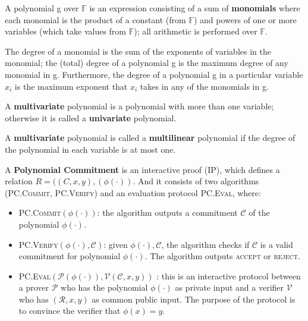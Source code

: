 \begin{definition}
A polynomial g over $\mathbb{F}$ is an expression consisting of a sum of \textbf{monomials} where each monomial is the product of a constant (from $\mathbb{F}$) and powers of one or more variables (which take values from $\mathbb{F}$); all arithmetic is performed over $\mathbb{F}$.
\end{definition}

\begin{definition}
The degree of a monomial is the sum of the exponents of variables in the monomial; the (total) degree of a polynomial g is the maximum degree of any monomial in g. Furthermore, the degree of a polynomial g in a particular variable $x_i$ is the maximum exponent that $x_i$ takes in any of the monomials in g.
\end{definition}

\begin{definition}
A \textbf{multivariate} polynomial is a polynomial with more than one variable; otherwise it is called a \textbf{univariate} polynomial.
\end{definition}

\begin{definition}
A \textbf{multivariate} polynomial is called a \textbf{multilinear} polynomial if the degree of the polynomial in each variable is at most one.
\end{definition}

\begin{definition}
A \textbf{Polynomial Commitment} is an interactive proof (IP), which defines a relation $R = ((C, x, y), (\phi(\cdot))$. 
And it consists of two algorithms (\textsc{PC.Commit}, \textsc{PC.Verify}) and an evaluation protocol \textsc{PC.Eval}, where:

\begin{itemize}
    \item \textsc{PC.Commit}$(\phi(\cdot))$: the algorithm outputs a commitment $\mathcal{C}$ of the polynomial $\phi(\cdot)$.
    
    \item \textsc{PC.Verify}$(\phi(\cdot), \mathcal{C})$: given $\phi(\cdot), \mathcal{C}$, the algorithm checks if $\mathcal{C}$ is a valid commitment for polynomial $\phi(\cdot)$. The algorithm outputs \textsc{accept} or \textsc{reject}.
    
    \item \textsc{PC.Eval}$(\mathcal{P}(\phi(\cdot)), \mathcal{V}(\mathcal{C}, x, y))$ : this is an  interactive protocol between a prover $\mathcal{P}$ who has the polynomial $\phi(\cdot)$ as private input and a verifier $\mathcal{V}$ who has $(\mathcal{R}, x, y)$ as common public input. The purpose of the protocol is to convince the verifier that $\phi(x) = y$.
\end{itemize}

\end{definition}

